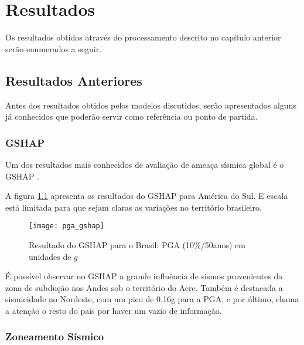 \chapter{Resultados}
\label{cap:resultados}

Os resultados obtidos através do processamento descrito no capítulo anterior
serão enumerados a seguir.


\section{Resultados Anteriores}
\label{sec:old_results}

Antes dos resultados obtidos pelos modelos discutidos, 
serão apresentados alguns já conhecidos que poderão servir como referência ou ponto de partida.

\subsection{GSHAP}
\label{sec:gshap}

Um dos resultados mais conhecidos de avaliação de ameaça sísmica global é o GSHAP \citep{giardini_1999}.

A figura \ref{fig:gshap} apresenta os resultados do GSHAP para América do Sul.
E escala está limitada para que sejam claras as variações no território brasileiro.

\begin{figure}[H]
  \centering
  \texttt{[image: pga\_gshap]} 
  \caption{Resultado do GSHAP para o Brasil: \gls{PGA} (10\%/50anos) em unidades de $g$}
  \label{fig:gshap} 
\end{figure}

É possível observar no GSHAP a grande influência de sismos provenientes da zona de subdução nos Andes 
sob o território do Acre. Também é destacada a sismicidade no Nordeste, com um pico de 0.16g para a PGA, e por
último, chama a atenção o resto do país por haver um vazio de informação.


\subsection{Zoneamento Sísmico}
\label{sec:zonning}

